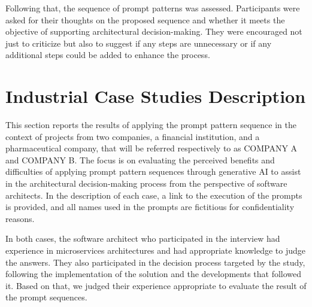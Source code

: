 \documentclass[runningheads]{llncs}
\begin{document}
Following that, the sequence of prompt patterns was assessed. Participants were asked for their thoughts on the proposed sequence and whether it meets the objective of supporting architectural decision-making. They were encouraged not just to criticize but also to suggest if any steps are unnecessary or if any additional steps could be added to enhance the process. 

\section{Industrial Case Studies Description}

This section reports the results of applying the prompt pattern sequence in the context of projects from two companies, a financial institution, and a pharmaceutical company, that will be referred respectively to as COMPANY A and COMPANY B. The focus is on evaluating the perceived benefits and difficulties of applying prompt pattern sequences through generative AI to assist in the architectural decision-making process from the perspective of software architects. In the description of each case, a link to the execution of the prompts is provided, and all names used in the prompts are fictitious for confidentiality reasons. 

In both cases, the software architect who participated in the interview had experience in microservices architectures and had appropriate knowledge to judge the answers. They also participated in the decision process targeted by the study, following the implementation of the solution and the developments that followed it. Based on that, we judged their experience appropriate to evaluate the result of the prompt sequences. 


\end{document}
